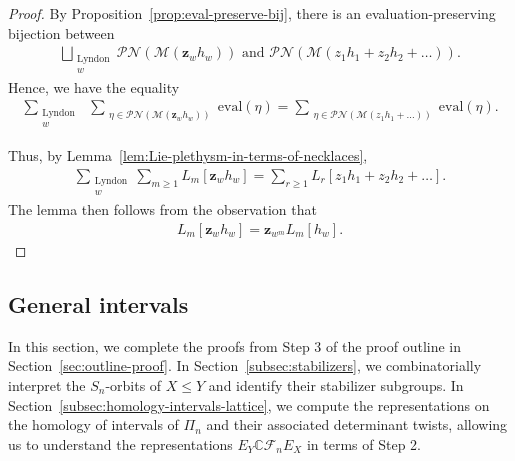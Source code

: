 \documentclass[ALCO, Unicode]{cedram}
\def\C{{\mathbb{C}}}
\begin{document}
\begin{proof} 
By Proposition~\ref{prop:eval-preserve-bij}, there is an evaluation-preserving bijection between \begin{align*}
\bigsqcup_{\substack{\text{Lyndon}\\ w}}\mathscr{PN}\left(\mathcal{M}\left(\mathbf{z}_wh_w\right)\right) \text{ and } \mathscr{PN}\left(\mathcal{M}\left(z_1 h_1 + z_2h_2 + \ldots\right)\right)  .
\end{align*}
Hence, we have the equality
\begin{align*}
   \sum_{\substack{\text{Lyndon}\\ w}} \ \ \sum_{\substack{\eta \in \mathscr{PN}(\mathcal{M}(\mathbf{z}_wh_w))}}\mathrm{eval}(\eta) = \sum_{\substack{\eta \in \mathscr{PN}(\mathcal{M}(z_1h_1 + \ldots))}}\mathrm{eval}(\eta).
\end{align*}



Thus, by Lemma~\ref{lem:Lie-plethysm-in-terms-of-necklaces},
\begin{align*}
\sum_{\substack{\text{Lyndon} \\ w}}\sum_{m \geq 1}L_m[\mathbf{z}_wh_w]
=  \sum_{r \geq 1}L_r[z_1h_1 + z_2h_2 + \ldots].
\end{align*}
The lemma then follows from the observation that 
\begin{align*}
L_m[\mathbf{z}_wh_w]
= \mathbf{z}_{w^{m}}L_m[h_w]. 
\end{align*}
\end{proof}


\subsection{General intervals}\label{sec:general-case}
In this section, we complete the proofs from Step 3 of the proof outline in Section~\ref{sec:outline-proof}. In Section~\ref{subsec:stabilizers}, we combinatorially interpret the $S_n$-orbits of $X \leq Y$ and identify their stabilizer subgroups. In Section~\ref{subsec:homology-intervals-lattice}, we compute the representations on the homology of intervals of $\Pi_n$ and their associated determinant twists, allowing us to understand the representations $E_Y\C \mathcal{F}_n E_X$ in terms of Step 2. 
\end{document}
